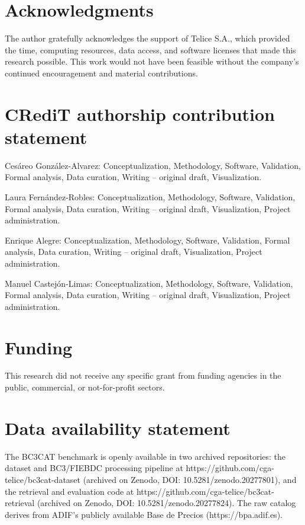 \documentclass[preprint,12pt]{elsarticle}
\begin{document}
\section*{Acknowledgments}

The author gratefully acknowledges the support of Telice S.A., which provided the time, computing resources, data access, and software licenses that made this research possible. This work would not have been feasible without the company’s continued encouragement and material contributions.

\section*{CRediT authorship contribution statement} %

Cesáreo González-Alvarez: Conceptualization, Methodology, Software, Validation, Formal analysis, Data curation, Writing – original draft, Visualization.

Laura Fernández-Robles: Conceptualization, Methodology, Software, Validation, Formal analysis, Data curation, Writing – original draft, Visualization, Project administration.

Enrique Alegre: Conceptualization, Methodology, Software, Validation, Formal analysis, Data curation, Writing – original draft, Visualization, Project administration.

Manuel Castejón-Limas: Conceptualization, Methodology, Software, Validation, Formal analysis, Data curation, Writing – original draft, Visualization, Project administration.

\section*{Funding}

This research did not receive any specific grant from funding agencies in the public, commercial, or not-for-profit sectors.

\section*{Data availability statement}

The BC3CAT benchmark is openly available in two archived repositories: the dataset and BC3/FIEBDC processing pipeline at https://github.com/cga-telice/bc3cat-dataset (archived on Zenodo, DOI: 10.5281/zenodo.20277801), and the retrieval and evaluation code at https://github.com/cga-telice/bc3cat-retrieval (archived on Zenodo, DOI: 10.5281/zenodo.20277824). The raw catalog derives from ADIF's publicly available Base de Precios (https://bpa.adif.es).
\end{document}

